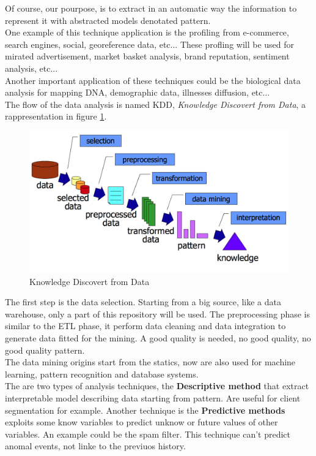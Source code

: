 \documentclass[12pt]{article}
\begin{document}
Of course, our pourpose, is to extract in an automatic way the information to represent it with abstracted models denotated pattern.\\
One example of this technique application is the profiling from e-commerce, search engines, social, georeference data, etc... These profling will be used for mirated advertisement, market basket analysis, brand reputation, sentiment analysis, etc...\\
Another important application of these techniques could be the biological data analysis for mapping DNA, demographic data, illnesses diffusion, etc...\\
The flow of the data analysis is named KDD, \textit{Knowledge Discovert from Data}, a rappresentation in figure \ref{fig:kdd}.
\begin{figure}[h!]
  \centering
  \includegraphics[width=0.9\linewidth]{images/kdd.png}
  \caption{Knowledge Discovert from Data}
  \label{fig:kdd}
\end{figure}
The first step is the data selection. Starting from a big source, like a data warehouse, only a part of this repository will be used. The preprocessing phase is similar to the ETL phase, it perform data cleaning and data integration to generate data fitted for the mining. A good quality is needed, no good quality, no good quality pattern.\\
The data mining origins start from the statics, now are also used for machine learning, pattern recognition and database systems.\\
The are two types of analysis techniques, the \textbf{Descriptive method} that extract interpretable model describing data starting from pattern. Are useful for client segmentation for example. Another technique is the \textbf{Predictive methods} exploits some know variables to predict unknow or future values of other variables. An example could be the spam filter. This technique can't predict anomal events, not linke to the previuos history.\\
\end{document}
